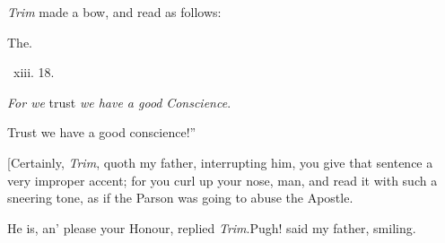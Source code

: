 \documentclass{article}
\begin{document}
\textit{Trim} made a bow, and read as follows:

\bigskip
\centerline{The\quad {}.}
\bigskip
\centerline{\textsc{}\, xiii. 18.}
\tsh \textit{For we} trust \textit{we have a good}\break
\textit{Conscience}.\tsh

\tsh 
Trust we have a good conscience!”

[Certainly, \textit{Trim}, quoth my father, interrupting him, you
give that sentence a very improper accent; for you curl up your
nose, man, and read it with such a sneering tone, as if the Parson
was going to abuse the Apostle.

He is, an’ please your Honour, replied \textit{Trim}.\quad Pugh!
said my father, smiling.
\end{document}
